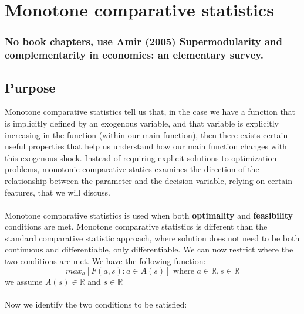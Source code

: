 \documentclass{article}
\begin{document}
\newpage
\section{Monotone comparative statistics}\label{mono}
\subsubsection*{No book chapters, use Amir (2005) Supermodularity and complementarity in economics: an
elementary survey.}

\subsection{Purpose}
Monotone comparative statistics tell us that, in the case we have a function that is implicitly defined by an exogenous variable, and that variable is explicitly increasing in the function (within our main function), then there exists certain useful properties that help us understand how our main function changes with this exogenous shock. Instead of requiring explicit solutions to optimization problems, monotonic comparative statics examines the direction of the relationship between the parameter and the decision variable, relying on certain features, that we will discuss. \\
\\ 
Monotone comparative statistics is used when both \textbf{optimality} and \textbf{feasibility} conditions are met. Monotone comparative statistics is different than the standard comparative statistic approach, where solution does not need to be both continuous and differentiable, only differentiable. We can now restrict where the two conditions are met. We have the following function: 
\[
max_{a} [ F(a,s): a \in A(s)] \text{ where } a \in \mathbb{R}, s \in \mathbb{R}
\] we assume $A(s) \in \mathbb{R}$ and $s\in \mathbb{R}$
\\
\\
\noindent Now we identify the two conditions to be satisfied: 
\end{document}
